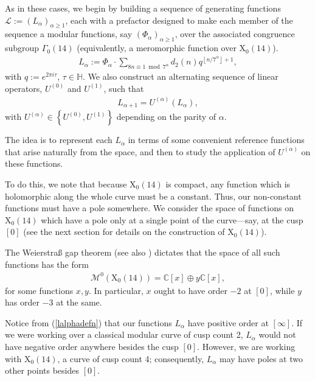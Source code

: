 \documentclass[reqno]{amsart}
\theoremstyle{definition}
\theoremstyle{remark}
\numberwithin{equation}{section}
\begin{document}
As in these cases, we begin by building a sequence of generating functions $\mathcal{L}:=\left(L_{\alpha}\right)_{\alpha\ge 1}$, each with a prefactor designed to make each member of the sequence a modular functions, say $(\Phi_{\alpha})_{\alpha \ge 1}$, over the associated congruence subgroup $\Gamma_0(14)$ (equivalently, a meromorphic function over $\mathrm{X}_0(14)$).
\begin{align}
L_{\alpha} := \Phi_{\alpha}\cdot\sum_{8n\equiv 1\bmod{7^{\alpha}}}d_2(n)q^{\left\lfloor n/7^{\alpha}\right\rfloor+1},\label{lalphadefn}
\end{align} with $q := e^{2\pi i\tau}$, $\tau\in\mathbb{H}$.  We also construct an alternating sequence of linear operators, $U^{(0)}$ and $U^{(1)}$, such that 
\begin{align}
L_{\alpha+1} = U^{(\alpha)}\left( L_{\alpha} \right),\label{ulagtlap1}
\end{align} with $U^{(\alpha)}\in\left\{U^{(0)},U^{(1)}\right\}$ depending on the parity of $\alpha$.

The idea is to represent each $L_{\alpha}$ in terms of some convenient reference functions that arise naturally from the space, and then to study the application of $U^{(\alpha)}$ on these functions.

To do this, we note that because $\mathrm{X}_0(14)$ is compact, any function which is holomorphic along the whole curve must be a constant.  Thus, our non-constant functions must have a pole somewhere.  We consider the space of functions on $\mathrm{X}_0(14)$ which have a pole only at a single point of the curve---say, at the cusp $[0]$ (see the next section for details on the construction of $\mathrm{X}_0(14)$). 

The Weierstraß gap theorem \cite{PRW} (see also \cite[Sect. III.5.3]{FK}) dictates that the space of all such functions has the form
\begin{align}
\mathcal{M}^{0}\left( \mathrm{X}_0(14) \right) = \mathbb{C}[x]\oplus y\mathbb{C}[x],\label{c0fspace}
\end{align} for some functions $x,y$.  In particular, $x$ ought to have order $-2$ at $[0]$, while $y$ has order $-3$ at the same.

Notice from (\ref{lalphadefn}) that our functions $L_{\alpha}$ have positive order at $[\infty]$.  If we were working over a classical modular curve of cusp count 2, $L_{\alpha}$ would not have negative order anywhere besides the cusp $[0]$.  However, we are working with $\mathrm{X}_0(14)$, a curve of cusp count 4; consequently, $L_{\alpha}$ may have poles at two other points besides $[0]$.
\end{document}
